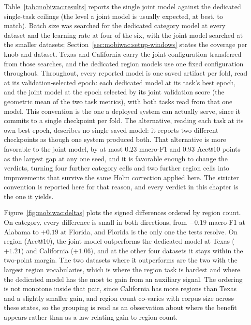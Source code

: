 Table~\ref{tab:mobiwac:results} reports the single joint model against the dedicated
single-task ceilings (the level a joint model is usually expected, at
best, to match). Batch size was searched for the dedicated category model at every dataset and the learning rate at
four of the six, with the joint model searched at the smaller datasets;
Section~\ref{sec:mobiwac:setup-windows} states the coverage per knob and dataset. Texas and California carry
the joint configuration transferred from those searches, and the dedicated region models use one
fixed configuration throughout.
Throughout, every reported model is one saved artifact per fold, read at its
validation-selected epoch: each dedicated model at its task's best epoch, and
the joint model at the epoch selected by its joint validation score (the
geometric mean of the two task metrics), with both tasks read from that one
model. This convention is the one a deployed system can actually serve, since it commits to a
single checkpoint per fold. The alternative, reading each task at its own best epoch, describes no
single saved model: it reports two different checkpoints as though one system produced both. That
alternative is more favorable to the joint model, by at most $0.23$ macro-F1 and $0.93$ Acc@10
points as the largest gap at any one seed, and it is favorable enough to change the verdicts,
turning four further category cells and two further region cells into improvements that survive the
same Holm correction applied here. The stricter convention is reported here for
that reason, and every verdict in this chapter is the one it yields.

\providecommand{\sd}[1]{\,{\scriptsize$\pm$#1}}


Figure~\ref{fig:mobiwac:deltas} plots the signed differences ordered by region count. On
category, every difference is small in both directions, from $-0.19$ macro-F1 at Alabama to
$+0.19$ at Florida, and Florida is the only one the tests resolve.
On region (Acc@10), the joint model outperforms the dedicated model at Texas ($+1.21$) and
California ($+1.06$), and at the other four datasets it stays within the two-point margin. The two
datasets where it outperforms are the two with the largest region vocabularies, which is where the
region task is hardest and where the dedicated model has the most to gain from an auxiliary signal.
The ordering is not monotone inside that pair, since California has more regions than Texas and a
slightly smaller gain, and region count co-varies with corpus size across these states, so the
grouping is read as an observation about where the benefit appears rather than as a law relating
gain to region count.

